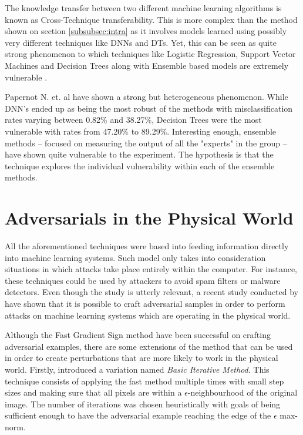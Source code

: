 \documentclass{article}
\begin{document}
The knowledge transfer between two different machine learning algorithms is known as Cross-Technique transferability. This is more complex than the method shown on section \ref{subsubsec:intra} as it involves models learned using possibly very different techniques like DNNs and DTs. Yet, this can be seen as quite strong phenomenon to which techniques like Logistic Regression, Support Vector Machines and Decision Trees along with Ensemble based models are extremely vulnerable \cite{papernot2016transf}.

Papernot N. et. al \cite{papernot2016transf} have shown a strong but heterogeneous phenomenon. While DNN's ended up as being the most robust of the methods with misclassification rates varying between 0.82\% and 38.27\%, Decision Trees were the most vulnerable with rates from 47.20\% to 89.29\%. Interesting enough, ensemble methods -- focused on measuring the output of all the "experts" in the group -- have shown quite vulnerable to the experiment. The hypothesis is that the technique explores the individual vulnerability within each of the ensemble methods.

\section{Adversarials in the Physical World}\label{sec:physical}

All the aforementioned techniques were based into feeding information directly into machine learning systems. Such model only takes into consideration situations in which attacks take place entirely within the computer. For instance, these techniques could be used by attackers to avoid spam filters or malware detectors. Even though the study is utterly relevant, a recent study conducted by \cite{goodfellow2016} have shown that it is possible to craft adversarial samples in order to perform attacks on machine learning systems which are operating in the physical world.

Although the Fast Gradient Sign method have been successful on crafting adversarial examples, there are some extensions of the method that can be used in order to create perturbations that are more likely to work in the physical world. Firstly, \cite{goodfellow2016} introduced a variation named \textit{Basic Iterative Method}. This technique consists of applying the fast method multiple times with small step sizes and making sure that all pixels are within a $\epsilon$-neighbourhood of the original image. The number of iterations was chosen heuristically with goals of being sufficient enough to have the adversarial example reaching the edge of the $\epsilon$ max-norm.
\end{document}
